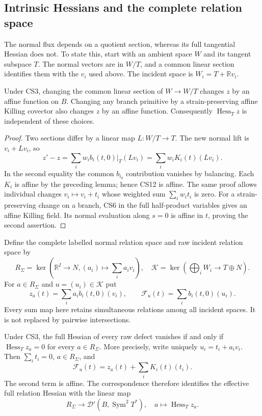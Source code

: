 \subsection{Intrinsic Hessians and the complete relation space}

The normal flux depends on a quotient section, whereas its full
tangential Hessian does not.  To state this, start with an ambient
space $W$ and its tangent subspace $T$.  The normal vectors are
in $W/T$, and a common linear section identifies them with the
$v_i$ used above.  The incident space is
$W_i=T+\mathbb Rv_i$.

\begin{lemma}
\label{lem:r13-flux-hessian-invariance}
Under CS3, changing the common linear section of $W\to W/T$
changes $z$ by an affine function on $B$.  Changing any branch
primitive by a strain-preserving affine Killing covector also
changes $z$ by an affine function.  Consequently
$\operatorname{Hess}_Tz$ is independent of these choices.
\end{lemma}

\begin{proof}
Two sections differ by a linear map $L:W/T\to T$.  The new
normal lift is $v_i+Lv_i$, so
\[
 z'-z=\sum_iw_i b_i(t,0)|_T(Lv_i)
      =\sum_iw_iK_i(t)(Lv_i).
 \tag{CS12}
\]
In the second equality the common $b_{i_0}$ contribution vanishes
by balancing.  Each $K_i$ is affine by the preceding lemma;
hence CS12 is affine.  The same proof allows individual changes
$v_i\mapsto v_i+t_i$ whose weighted sum $\sum_iw_it_i$ is zero.
For a strain-preserving change on a branch, CS6 in the full
half-product variables gives an affine Killing field.  Its
normal evaluation along $s=0$ is affine in $t$, proving the
second assertion.
\end{proof}

Define the complete labelled normal relation space and raw
incident relation space by
\[
 R_\Sigma=\ker\left(\mathbb R^I\longrightarrow N,
                         (a_i)\longmapsto\sum_ia_iv_i\right),
 \quad
 \mathcal K=\ker\left(\bigoplus_iW_i\longrightarrow T\oplus N\right).
 \tag{CS13}
\]
For $a\in R_\Sigma$ and $u=(u_i)\in\mathcal K$ put
\[
 z_a(t)=\sum_i a_i b_i(t,0)(v_i),\qquad
 \mathcal F_u(t)=\sum_i b_i(t,0)(u_i).
 \tag{CS14}
\]
Every sum map here retains simultaneous relations among all
incident spaces.  It is not replaced by pairwise intersections.

\begin{proposition}
\label{prop:r13-raw-hessian-reduction}
Under CS3, the full Hessian of every raw defect vanishes if and
only if $\operatorname{Hess}_Tz_a=0$ for every
$a\in R_\Sigma$.  More precisely, write uniquely
$u_i=t_i+a_iv_i$.  Then $\sum_it_i=0$, $a\in R_\Sigma$, and
\[
        \mathcal F_u(t)=z_a(t)+\sum_iK_i(t)(t_i).
 \tag{CS15}
\]
The second term is affine.  The correspondence therefore
identifies the effective full relation Hessian with the linear
map
\[
 R_\Sigma\longrightarrow\mathcal D'(B,\operatorname{Sym}^2T^*),
                    \quad a\longmapsto\operatorname{Hess}_Tz_a.
 \tag{CS16}
\]
\end{proposition}

